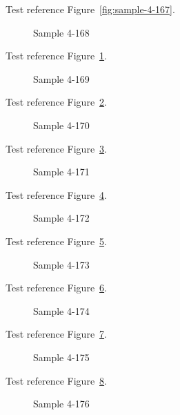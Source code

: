 Test reference Figure~\ref{fig:sample-4-167}.

\begin{figure}[tbhp]
\caption{Sample 4-168}
\label{fig:sample-4-168}
\end{figure}

Test reference Figure~\ref{fig:sample-4-168}.

\begin{figure}[tbhp]
\caption{Sample 4-169}
\label{fig:sample-4-169}
\end{figure}

Test reference Figure~\ref{fig:sample-4-169}.

\begin{figure}[tbhp]
\caption{Sample 4-170}
\label{fig:sample-4-170}
\end{figure}

Test reference Figure~\ref{fig:sample-4-170}.

\begin{figure}[tbhp]
\caption{Sample 4-171}
\label{fig:sample-4-171}
\end{figure}

Test reference Figure~\ref{fig:sample-4-171}.

\begin{figure}[tbhp]
\caption{Sample 4-172}
\label{fig:sample-4-172}
\end{figure}

Test reference Figure~\ref{fig:sample-4-172}.

\begin{figure}[tbhp]
\caption{Sample 4-173}
\label{fig:sample-4-173}
\end{figure}

Test reference Figure~\ref{fig:sample-4-173}.

\begin{figure}[tbhp]
\caption{Sample 4-174}
\label{fig:sample-4-174}
\end{figure}

Test reference Figure~\ref{fig:sample-4-174}.

\begin{figure}[tbhp]
\caption{Sample 4-175}
\label{fig:sample-4-175}
\end{figure}

Test reference Figure~\ref{fig:sample-4-175}.

\begin{figure}[tbhp]
\caption{Sample 4-176}
\label{fig:sample-4-176}
\end{figure}

